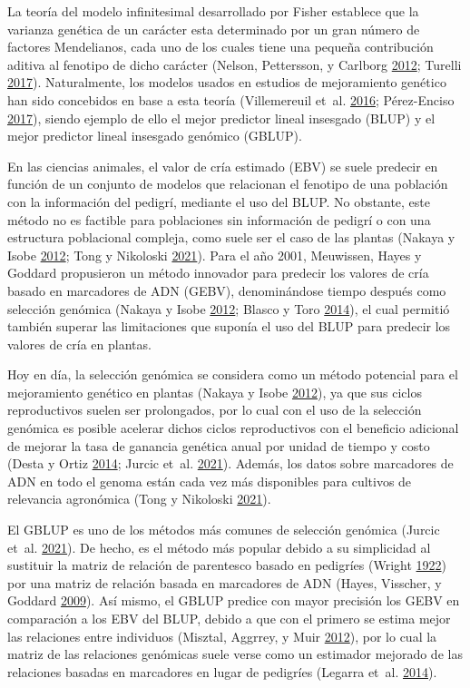 \documentclass[11pt,spanish,a4paper,oneside,]{book} %
\begin{document}
La teoría del modelo infinitesimal desarrollado por Fisher establece que la varianza genética de un carácter esta determinado por un gran número de factores Mendelianos, cada uno de los cuales tiene una pequeña contribución aditiva al fenotipo de dicho carácter (Nelson, Pettersson, y Carlborg \protect\hyperlink{ref-cite:2}{2012}; Turelli \protect\hyperlink{ref-cite:9}{2017}). Naturalmente, los modelos usados en estudios de mejoramiento genético han sido concebidos en base a esta teoría (Villemereuil et~al. \protect\hyperlink{ref-cite:4}{2016}; Pérez-Enciso \protect\hyperlink{ref-cite:5}{2017}), siendo ejemplo de ello el mejor predictor lineal insesgado (BLUP) y el mejor predictor lineal insesgado genómico (GBLUP).

En las ciencias animales, el valor de cría estimado (EBV) se suele predecir en función de un conjunto de modelos que relacionan el fenotipo de una población con la información del pedigrí, mediante el uso del BLUP. No obstante, este método no es factible para poblaciones sin información de pedigrí o con una estructura poblacional compleja, como suele ser el caso de las plantas (Nakaya y Isobe \protect\hyperlink{ref-cite:6}{2012}; Tong y Nikoloski \protect\hyperlink{ref-cite:7}{2021}). Para el año 2001, Meuwissen, Hayes y Goddard propusieron un método innovador para predecir los valores de cría basado en marcadores de ADN (GEBV), denominándose tiempo después como selección genómica (Nakaya y Isobe \protect\hyperlink{ref-cite:6}{2012}; Blasco y Toro \protect\hyperlink{ref-cite:3}{2014}), el cual permitió también superar las limitaciones que suponía el uso del BLUP para predecir los valores de cría en plantas.

Hoy en día, la selección genómica se considera como un método potencial para el mejoramiento genético en plantas (Nakaya y Isobe \protect\hyperlink{ref-cite:6}{2012}), ya que sus ciclos reproductivos suelen ser prolongados, por lo cual con el uso de la selección genómica es posible acelerar dichos ciclos reproductivos con el beneficio adicional de mejorar la tasa de ganancia genética anual por unidad de tiempo y costo (Desta y Ortiz \protect\hyperlink{ref-cite:10}{2014}; Jurcic et~al. \protect\hyperlink{ref-cite:11}{2021}). Además, los datos sobre marcadores de ADN en todo el genoma están cada vez más disponibles para cultivos de relevancia agronómica (Tong y Nikoloski \protect\hyperlink{ref-cite:7}{2021}).

El GBLUP es uno de los métodos más comunes de selección genómica (Jurcic et~al. \protect\hyperlink{ref-cite:11}{2021}). De hecho, es el método más popular debido a su simplicidad al sustituir la matriz de relación de parentesco basado en pedigríes (Wright \protect\hyperlink{ref-cite:12}{1922}) por una matriz de relación basada en marcadores de ADN (Hayes, Visscher, y Goddard \protect\hyperlink{ref-cite:13}{2009}). Así mismo, el GBLUP predice con mayor precisión los GEBV en comparación a los EBV del BLUP, debido a que con el primero se estima mejor las relaciones entre individuos (Misztal, Aggrrey, y Muir \protect\hyperlink{ref-cite:14}{2012}), por lo cual la matriz de las relaciones genómicas suele verse como un estimador mejorado de las relaciones basadas en marcadores en lugar de pedigríes (Legarra et~al. \protect\hyperlink{ref-cite:15}{2014}).
\end{document}
